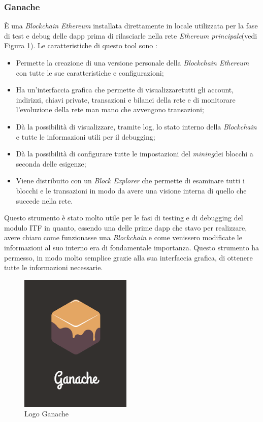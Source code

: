 \subsubsection{Ganache}
È una \textit{Blockchain Ethereum} installata direttamente in locale utilizzata per la fase di test e debug delle \gls{dapp} prima di rilasciarle nella rete \textit{Ethereum principale}(vedi Figura \ref{img:ganache}).
Le caratteristiche di questo tool sono \cite{ganache}:
\begin{itemize}
	\item Permette la creazione di una versione personale della \textit{Blockchain Ethereum} con tutte le sue caratteristiche e configurazioni;
	\item Ha un'interfaccia grafica che permette di visualizzaretutti gli account, indirizzi, chiavi private, transazioni e bilanci della rete e di monitorare l'evoluzione della rete man mano che avvengono transazioni;
	\item Dà la possibilità di visualizzare, tramite log, lo stato interno della \textit{Blockchain} e tutte le informazioni utili per il debugging;
	\item Dà la possibilità di configurare tutte le impostazioni del \emph{\gls{mining}}\glsfirstoccur dei blocchi a seconda delle esigenze;
	\item Viene distribuito con un \textit{Block Explorer} che permette di esaminare tutti i blocchi e le transazioni in modo da avere una visione interna di quello che succede nella rete.
\end{itemize}
Questo strumento è stato molto utile per le fasi di testing e di debugging del modulo \gls{ITF} in quanto, essendo una delle prime \gls{dapp} che stavo per realizzare, avere chiaro come funzionasse una \textit{Blockchain} e come venissero modificate le informazioni al suo interno era di fondamentale importanza. Questo strumento ha permesso, in modo molto semplice grazie alla sua interfaccia grafica, di ottenere tutte le informazioni necessarie.
\begin{figure}[h]
	\centering
	\includegraphics[scale=0.5]{immagini/ganache}
	\caption{Logo Ganache}
	\label{img:ganache}
\end{figure}

